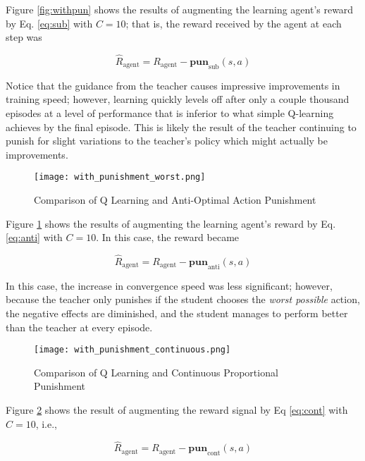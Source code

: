\documentclass[twocolumn]{article}
\begin{document}
Figure \ref{fig:withpun} shows the results of augmenting the learning
agent's reward by Eq. \ref{eq:sub} with \(C=10\); that is, the reward
received by the agent at each step was

\begin{equation}
\hat{R}_{\text{agent}} = R_{\text{agent}} - \textbf{pun}_{\text{sub}}(s,a)
\label{eq:reward1}\end{equation}

Notice that the guidance from the teacher causes impressive improvements
in training speed; however, learning quickly levels off after only a
couple thousand episodes at a level of performance that is inferior to
what simple Q-learning achieves by the final episode. This is likely the
result of the teacher continuing to punish for slight variations to the
teacher's policy which might actually be improvements.

\begin{figure}
\hypertarget{fig:withpun2}{\centering
\texttt{[image: with\_punishment\_worst.png]}
\caption{Comparison of Q Learning and Anti-Optimal Action
Punishment}\label{fig:withpun2}
}
\end{figure}

Figure \ref{fig:withpun2} shows the results of augmenting the learning
agent's reward by Eq. \ref{eq:anti} with \(C=10\). In this case, the
reward became

\begin{equation}
\hat{R}_{\text{agent}} = R_{\text{agent}} - \textbf{pun}_{\text{anti}}(s,a)
\label{eq:reward2}\end{equation}

In this case, the increase in convergence speed was less significant;
however, because the teacher only punishes if the student chooses the
\emph{worst possible} action, the negative effects are diminished, and
the student manages to perform better than the teacher at every episode.

\begin{figure}
\hypertarget{fig:withpun3}{\centering
\texttt{[image: with\_punishment\_continuous.png]}
\caption{Comparison of Q Learning and Continuous Proportional
Punishment}\label{fig:withpun3}
}
\end{figure}

Figure \ref{fig:withpun3} shows the result of augmenting the reward
signal by Eq \ref{eq:cont} with \(C=10\), i.e.,

\begin{equation}
\hat{R}_{\text{agent}} = R_{\text{agent}} - \textbf{pun}_{\text{cont}}(s,a)
\label{eq:reward3}\end{equation}
\end{document}
